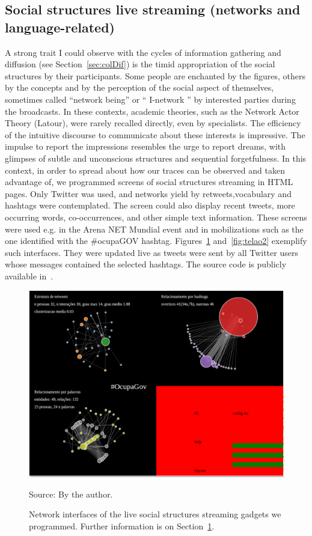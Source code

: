 \begin{apendicesenv}
\section{Social structures live streaming (networks and language-related)}\label{sec:sss}
A strong trait I could observe with the cycles of information gathering and diffusion (see Section~\ref{sec:colDif})
is the timid appropriation of the social structures by their participants.
Some people are enchanted by the figures,
others by the concepts and by the perception of the social aspect of themselves,
sometimes called ``network being'' or `` I-network '' by interested parties during the broadcasts.
In these contexts, academic theories, such as the Network Actor Theory (Latour),
were rarely recalled directly, even by specialists.
The efficiency of the intuitive discourse to communicate about these interests is impressive.
The impulse to report the impressions resembles the urge to report dreams,
with glimpses of subtle and unconscious structures and sequential forgetfulness.
In this context, in order to spread about how our traces can be observed and taken advantage of,
we programmed screens of social structures streaming in HTML pages.
Only Twitter was used, and networks yield by retweets,vocabulary and hashtags were contemplated.
The screen could also display recent tweets, more occurring words, co-occurrences,
and other simple text information.
These screens were used e.g. in the Arena NET Mundial event
and in mobilizations such as the one identified with the \#ocupaGOV hashtag.
Figures~\ref{fig:telao1} and~\ref{fig:telao2} exemplify such interfaces.
They were updated live as tweets were sent by all Twitter users whose messages
contained the selected hashtags.
The source code is publicly available in~\cite{teloes}.

\begin{figure}[H]
  \centering
    \includegraphics[width=.85\textwidth]{figs/telao1.png}
  \caption{Network interfaces of the live social structures streaming gadgets we programmed.
	Further information is on Section~\ref{sec:sss}.}\label{fig:telao1}
\begin{flushleft}\footnotesize
Source: By the author.\
\end{flushleft}
\end{figure}


\end{apendicesenv}
